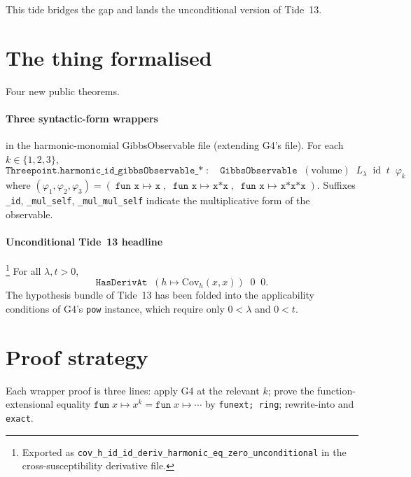 \documentclass[11pt]{article}
\begin{document}
This tide bridges the gap and lands the unconditional version of
Tide~13.

\section{The thing formalised}

Four new public theorems.

\paragraph{Three syntactic-form wrappers}
in the harmonic-monomial GibbsObservable file (extending G4's file).
For each $k \in \{1, 2, 3\}$,
\[
  \texttt{Threepoint.harmonic\_id\_gibbsObservable\_*}\;:\quad
  \texttt{GibbsObservable}\;\;
  (\mathrm{volume})\;\;
  L_\lambda\;\;
  \mathrm{id}\;\;
  t\;\;
  \varphi_k
\]
where $(\varphi_1, \varphi_2, \varphi_3) = (\texttt{fun x \(\mapsto\) x},\;
\texttt{fun x \(\mapsto\) x*x},\;
\texttt{fun x \(\mapsto\) x*x*x})$. Suffixes
\texttt{\_id}, \texttt{\_mul\_self}, \texttt{\_mul\_mul\_self}
indicate the multiplicative form of the observable.

\paragraph{Unconditional Tide~13 headline}\footnote{Exported as
\texttt{cov\_h\_id\_id\_deriv\_harmonic\_eq\_zero\_unconditional}
in the cross-susceptibility derivative file.} For all
$\lambda, t > 0$,
\[
  \texttt{HasDerivAt}\;\;
    (h \mapsto \mathrm{Cov}_h(x, x))\;\;
    0\;\;
    0.
\]
The hypothesis bundle of Tide~13 has been folded into the
applicability conditions of G4's \texttt{pow} instance, which require
only $0 < \lambda$ and $0 < t$.

\section{Proof strategy}

Each wrapper proof is three lines: apply G4 at the relevant $k$;
prove the function-extensional equality
$\texttt{fun}\;x \mapsto x^k = \texttt{fun}\;x \mapsto \cdots$ by
\texttt{funext;\,ring}; rewrite-into and \texttt{exact}.
\end{document}
